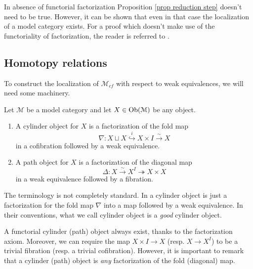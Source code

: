 \begin{refsection}
\begin{rmk}
In absence of functorial factorization Proposition \ref{prop reduction step} doesn't need to be true. However, it can be shown that even in that case the localization of a model category exists. For a proof which doesn't make use of the functoriality of factorization, the reader is referred to \cite[Section 4]{dwsp}.
\end{rmk}

\subsection{Homotopy relations}

To construct the localization of $\mathcal M_{cf}$ with respect to weak equivalences, we will need some machinery.

\begin{defin}
Let $\mathcal M$ be a model category and let $X \in \operatorname{Ob}(\mathcal M)$ be any object.
\begin{enumerate}

\item A cylinder object for $X$ is a factorization of the fold map
\[
\nabla \colon X \sqcup X \stackrel{i}{\hookrightarrow} X \times I \stackrel{\sim}{\to} X
\]
in a cofibration followed by a weak equivalence.

\item A path object for $X$ is a factorization of the diagonal map
\[
\Delta \colon X \stackrel{\sim}{\to} X^I \twoheadrightarrow X \times X
\]
in a weak equivalence followed by a fibration.
\end{enumerate}
\end{defin}

\begin{rmk}
The terminology is not completely standard. In \cite{dwsp} a cylinder object is just a factorization for the fold map $\nabla$ into a map followed by a weak equivalence. In their conventions, what we call cylinder object is a \emph{good} cylinder object.
\end{rmk}

\begin{rmk}
A functorial cylinder (path) object always exist, thanks to the factorization axiom. Moreover, we can require the map $X \times I \to X$ (resp. $X \to X^I$) to be a trivial fibration (resp. a trivial cofibration). However, it is important to remark that a cylinder (path) object is \emph{any} factorization of the fold (diagonal) map.
\end{rmk}


\end{refsection}
